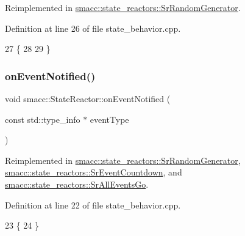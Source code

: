 Reimplemented in \hyperlink{classsmacc_1_1state__reactors_1_1SrRandomGenerator_a093fa3de1ca4f84c74cc0cb0f093cb31}{smacc\+::state\+\_\+reactors\+::\+Sr\+Random\+Generator}.



Definition at line 26 of file state\+\_\+behavior.\+cpp.


\begin{DoxyCode}
27 \{
28 
29 \}
\end{DoxyCode}
\mbox{\label{classsmacc_1_1StateReactor_a17646b3c68a6d80d1e4da8c14238ce36}} 
\subsubsection{\texorpdfstring{on\+Event\+Notified()}{onEventNotified()}}
{\footnotesize\ttfamily void smacc\+::\+State\+Reactor\+::on\+Event\+Notified (\begin{DoxyParamCaption}\item[{const std\+::type\+\_\+info $\ast$}]{event\+Type }\end{DoxyParamCaption})\hspace{0.3cm}{\ttfamily [virtual]}}



Reimplemented in \hyperlink{classsmacc_1_1state__reactors_1_1SrRandomGenerator_a8635347245b76d17355fe374e854144f}{smacc\+::state\+\_\+reactors\+::\+Sr\+Random\+Generator}, \hyperlink{classsmacc_1_1state__reactors_1_1SrEventCountdown_a6cc15cf6633bd882ac40a87d698b3b6b}{smacc\+::state\+\_\+reactors\+::\+Sr\+Event\+Countdown}, and \hyperlink{classsmacc_1_1state__reactors_1_1SrAllEventsGo_abd72dc79374c34111d24691c459850c2}{smacc\+::state\+\_\+reactors\+::\+Sr\+All\+Events\+Go}.



Definition at line 22 of file state\+\_\+behavior.\+cpp.


\begin{DoxyCode}
23 \{
24 \}
\end{DoxyCode}
\mbox{\label{classsmacc_1_1StateReactor_aa10b2c6b7d1e80f01b00cbdac526a2bf}} 
